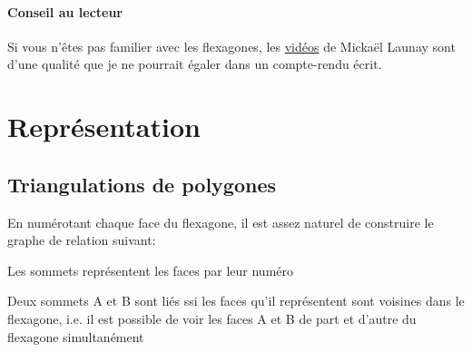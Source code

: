 \documentclass[10pt,a4paper]{article}
\begin{document}
\def\hepta{
    \coordinate (A) at (-0.76,1.54);
    \coordinate (B) at (-0.76,0.69);
    \coordinate (C) at (-0.10,0.16);
    \coordinate (D) at (0.73,0.35);
    \coordinate (E) at (1.1,1.11);
    \coordinate (F) at (0.73,1.88);
    \coordinate (G) at (-0.10,2.07);
	\draw(A) -- (B) -- (C) -- (D) -- (E) -- (F) -- (G) -- cycle;}

\newcommand{\polygon}[1]{%
	\def\N {#1}
    \foreach \x in {1,2,...,#1} {
        \draw ((360/#1)*\x - 30 :4) -- (90+(360/#1)*\x:4);
        \draw (-30+120*\x:5) node{\x}-- (-30+(360/#1)*\x:5);
	};
}
\newcommand{\slice}[1]{%
    \hepta
    \draw \foreach \x/\y in {#1} {(\x)--(\y)};}

\paragraph{Conseil au lecteur}
	Si vous n'êtes pas familier avec les flexagones, les 
	\href{https://www.youtube.com/playlist?list=PLNefH6S6myiO_5HBDdtP_r_LlCcVwA04I}{vidéos} 
	 de Mickaël Launay sont d'une qualité que je ne pourrait égaler dans un compte-rendu écrit.
	
	\section{Représentation}
	\subsection{Triangulations de polygones}
		En numérotant chaque face du flexagone, il est assez naturel de construire le graphe de relation suivant:
		
		\begin{list}{•}{}
		\item Les sommets représentent les faces par leur numéro
		\item Deux sommets A et B sont liés ssi les faces qu'il représentent sont voisines dans le flexagone, i.e.
			il est possible de voir les faces A et B de part et d'autre du flexagone simultanément
		\end{list}
		
\end{document}
